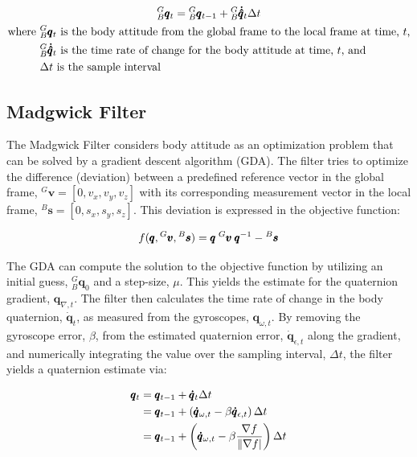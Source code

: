 \begin{gather} \labeq{mahony_filter}
    {}^G_B\pmb{q}_t = {}^G_B\pmb{q}_{t-1} + {}^G_B\pmb{\dot{\hat{q}}}_t \Delta t \\
    \begin{aligned}
        \text{where } &{}^G_B\pmb{q}_t \text{ is the body attitude from the global frame to the local frame at time, $t$,} \\
                      &{}^G_B\pmb{\dot{\hat{q}}}_t \text{ is the time rate of change for the body attitude at time, $t$, and } \\
                      &\Delta t \text{ is the sample interval}
    \end{aligned} \notag
\end{gather}

\subsection{Madgwick Filter} 
The Madgwick Filter \cite{Madgwick:dissertation} considers body attitude as an optimization problem that can be solved by a gradient descent algorithm (GDA).
The filter tries to optimize the difference (deviation) between a predefined reference vector in the global frame, ${}^G\pmb{v} = [0, v_x, v_y, v_z]$ with its corresponding measurement vector in the local frame, ${}^B\pmb{s} = [0, s_x, s_y, s_z]$.
This deviation is expressed in the objective function:

\begin{equation} \labeq{madgwick_obj_func}
    f(\pmb{q}, {}^G\pmb{v}, {}^B\pmb{s}) = \pmb{q} \hspace{0.25em} {}^G\pmb{v} \hspace{0.25em} \pmb{q}^{-1} - {}^B\pmb{s}
\end{equation}

The GDA can compute the solution to the objective function by utilizing an initial guess, ${}^G_B \pmb{q}_0$ and a step-size, $\mu$.
This yields the estimate for the quaternion gradient, $\pmb{q}_{\nabla,t}$.
The filter then calculates the time rate of change in the body quaternion, $\pmb{\dot{q}}_t$, as measured from the gyroscopes, $\pmb{q}_{\omega,t}$.
By removing the gyroscope error, $\beta$, from the estimated quaternion error, $\pmb{\dot{q}}_{\epsilon, t}$ along the gradient, and numerically integrating the value over the sampling interval, $\Delta t$, the filter yields a quaternion estimate via:

\begin{align} \labeq{madgwick_filter}
    \pmb{q}_t &= \pmb{q}_{t-1} + \pmb{\dot{q}}_t \Delta t \\
              &= \pmb{q}_{t-1} + \left( \pmb{\dot{q}}_{\omega, t} - \beta \pmb{\dot{q}}_{\epsilon, t} \right) \Delta t \\
              &= \pmb{q}_{t-1} + \left( \pmb{\dot{q}}_{\omega, t} - \beta \frac{\nabla f}{\lVert \nabla f \rvert}\right) \Delta t
\end{align}

